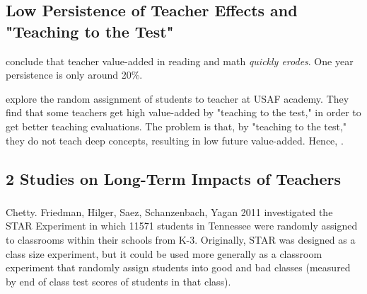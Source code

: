     \subsection{Low Persistence of Teacher Effects and "Teaching to the Test"}

        \cite{jacob_persistence_2008} conclude that teacher value-added in reading and math \emph{quickly erodes}. One year persistence is only around 20\%.

        \cite{carrell_does_2008} explore the random assignment of students to teacher at USAF academy. They find that some teachers get high value-added by "teaching to the test," in order to get better teaching evaluations. The problem is that, by "teaching to the test," they do not teach deep concepts, resulting in low future value-added. Hence, .

    \subsection{2 Studies on Long-Term Impacts of Teachers}

        \subsubsection{\cite{chetty_how_2011}}

            Chetty. Friedman, Hilger, Saez, Schanzenbach, Yagan 2011 investigated the STAR Experiment in which 11571 students in Tennessee were randomly assigned to classrooms within their schools from K-3. Originally, STAR was designed as a class size experiment, but it could be used more generally as a classroom experiment that randomly assign students into good and bad classes (measured by end of class test scores of students in that class).

